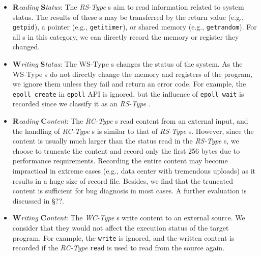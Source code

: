 \begin{itemize}
\item
\noindent\textbf{R}\textit{eading} \textbf{S}\textit{tatus}: 
The \textit{RS-Type} \syscall{}s
aim to read information related to system status. The results of
these \syscall{}s may be transferred by the return value (e.g., \texttt{getpid}), 
a pointer (e.g., \texttt{getitimer}), or shared memory (e.g.,
\texttt{getrandom}). For all \syscall{}s
in this category, we can directly record the memory or register they changed.

\item
\noindent\textbf{W}\textit{riting} \textbf{S}\textit{tatus}: 
The WS-Type \syscall{}s
changes the status of the system. As the WS-Type \syscall{}s do not
directly change the memory and registers of the program, we ignore
them unless they fail and return an error code. 
For example, the \syscall{} \texttt{epoll\_create} in \texttt{epoll} API
is ignored, but the influence of \syscall{} \texttt{epoll\_wait} is
recorded since we classify it as an \textit{RS-Type} \syscall{}.


\item
\noindent\textbf{R}\textit{eading} \textbf{C}\textit{ontent}: 
The \textit{RC-Type} \syscall{}s read content from an external input, and the
handling of \textit{RC-Type} \syscall{}s is similar to that of \textit{RS-Type} 
\syscall{}s. However, since the content is usually much larger than
the status read in the \textit{RS-Type} \syscall{}s, we choose to
truncate the content and record only the first 256 bytes due to
performance requirements. Recording the entire content may become
impractical in extreme cases (e.g., data center with tremendous
uploads) as it results in a huge size of record file. 
Besides, we find that the truncated content is sufficient for bug diagnosis in
most cases. A further evaluation is discussed in
\S ??.

\item
\noindent\textbf{W}\textit{riting} \textbf{C}\textit{ontent}:
The \textit{WC-Type} \syscall{}s write content to an external source. We 
consider that they would not affect the execution status of the target
program. For example, the \syscall{} \texttt{write} is ignored, and
the written content is recorded if the \textit{RC-Type} \syscall{}
\texttt{read} is used to read from the source again.
\end{itemize}



